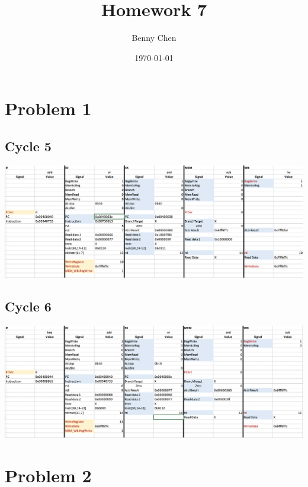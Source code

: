 \documentclass{article}
\title{Homework 7}
\author{Benny Chen}
\date{\today}
\begin{document}
\maketitle

\section*{Problem 1}

\subsection*{Cycle 5}
\begin{center}
    \includegraphics[width=\textwidth]{images/cycle_5.png}
\end{center}

\subsection*{Cycle 6}
\begin{center}
    \includegraphics[width=\textwidth]{images/cycle_6.png}
\end{center}

\newpage

\section*{Problem 2}
\end{document}
